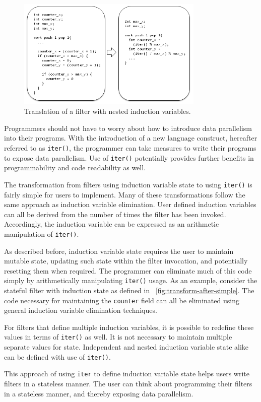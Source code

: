 \begin{figure}[t]
\includegraphics[width=3.5in]{transformation3.png}
\caption{Translation of a filter with nested induction variables. \protect\label{fig:transform-after-twonested}}
\end{figure}

Programmers should not have to worry about how to introduce data parallelism into their programs.  With the introduction of a new language construct, hereafter referred to as {\tt iter()}, the programmer can take measures to write their programs to expose data parallelism.  Use of {\tt iter()} potentially provides further benefits in programmability and code readability as well.

The transformation from filters using induction variable state to using {\tt iter()} is fairly simple for users to implement.  Many of these transformations follow the same approach as induction variable elimination.  User defined induction variables can all be derived from the number of times the filter has been invoked.  Accordingly, the induction variable can be expressed as an arithmetic manipulation of {\tt iter()}.  

As described before, induction variable state requires the user to maintain mutable state, updating such state within the filter invocation, and potentially resetting them when required. The programmer can eliminate much of this code simply by arithmetically manipulating {\tt iter()} usage.  As an example, consider the stateful filter with induction state as defined in ~\ref{fig:transform-after-simple}.  The code necessary for maintaining the {\tt counter} field can all be eliminated using general induction variable elimination techniques.  

For filters that define multiple induction variables, it is possible to redefine these values in terms of {\tt iter()} as well.  It is not necessary to maintain multiple separate values for state.  Independent and nested induction variable state alike can be defined with use of {\tt iter()}.

This approach of using {\tt iter} to define induction variable state helps users write filters in a stateless manner.  The user can think about programming their filters in a stateless manner, and thereby exposing data parallelism. 


